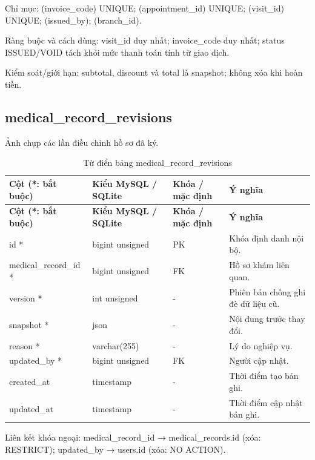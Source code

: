 Chỉ mục:\allowbreak{} (invoice\_\allowbreak{}code) UNIQUE; (appointment\_\allowbreak{}id) UNIQUE; (visit\_\allowbreak{}id) UNIQUE; (issued\_\allowbreak{}by); (branch\_\allowbreak{}id).\allowbreak{}

Ràng buộc và cách dùng:\allowbreak{} visit\_\allowbreak{}id duy nhất; invoice\_\allowbreak{}code duy nhất; status ISSUED/\allowbreak{}VOID tách khỏi mức thanh toán tính từ giao dịch.\allowbreak{}

Kiểm soát/\allowbreak{}giới hạn:\allowbreak{} subtotal, discount và total là snapshot; không xóa khi hoàn tiền.\allowbreak{}

\clearpage

\subsection{medical\_\allowbreak{}record\_\allowbreak{}revisions}
Ảnh chụp các lần điều chỉnh hồ sơ đã ký.\allowbreak{}


{\fontsize{10}{12}\selectfont\setlength{\tabcolsep}{3pt}\renewcommand{\arraystretch}{1.12}
\begin{longtable}{@{}L{\textwidth-4.86pt\relax} L{\textwidth-3.96pt\relax} L{\textwidth-2.88pt\relax} L{\textwidth-6.3pt\relax}@{}}
\caption{Từ điển bảng medical\_\allowbreak{}record\_\allowbreak{}revisions}\\
\toprule
\textbf{Cột (*:\allowbreak{} bắt buộc)} & \textbf{Kiểu My\allowbreak{}SQL /\allowbreak{} SQLite} & \textbf{Khóa /\allowbreak{} mặc định} & \textbf{Ý nghĩa}\\\midrule
\endfirsthead
\toprule
\textbf{Cột (*:\allowbreak{} bắt buộc)} & \textbf{Kiểu My\allowbreak{}SQL /\allowbreak{} SQLite} & \textbf{Khóa /\allowbreak{} mặc định} & \textbf{Ý nghĩa}\\\midrule
\endhead
\bottomrule\endlastfoot
id * & bigint unsigned & PK & Khóa định danh nội bộ.\allowbreak{}\\[1pt]
medical\_\allowbreak{}record\_\allowbreak{}id * & bigint unsigned & FK & Hồ sơ khám liên quan.\allowbreak{}\\[1pt]
version * & int unsigned & - & Phiên bản chống ghi đè dữ liệu cũ.\allowbreak{}\\[1pt]
snapshot * & json & - & Nội dung trước thay đổi.\allowbreak{}\\[1pt]
reason * & varchar(255) & - & Lý do nghiệp vụ.\allowbreak{}\\[1pt]
updated\_\allowbreak{}by * & bigint unsigned & FK & Người cập nhật.\allowbreak{}\\[1pt]
created\_\allowbreak{}at & timestamp & - & Thời điểm tạo bản ghi.\allowbreak{}\\[1pt]
updated\_\allowbreak{}at & timestamp & - & Thời điểm cập nhật bản ghi.\allowbreak{}\\[1pt]
\end{longtable}}
Liên kết khóa ngoại:\allowbreak{} medical\_\allowbreak{}record\_\allowbreak{}id → medical\_\allowbreak{}records.\allowbreak{}id (xóa:\allowbreak{} RESTRICT); updated\_\allowbreak{}by → users.\allowbreak{}id (xóa:\allowbreak{} NO ACTION).\allowbreak{}

